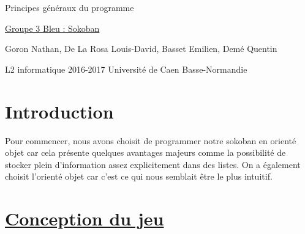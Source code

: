 \documentclass{article}
\begin{document}
\begin{titlepage}
\begin{center}
\Huge Principes généraux du programme

\normalsize
\vspace{0.5cm}
\Large {\underline{ Groupe 3 Bleu : Sokoban} }

\vspace{1cm}
\normalsize
Goron Nathan, De La Rosa Louis-David, Basset Emilien, Demé Quentin

\vspace{14.5cm}
L2 informatique 2016-2017 Université de Caen Basse-Normandie
\end{center}
\end{titlepage}


\newpage
\section{Introduction}
Pour commencer, nous avons choisit de programmer notre sokoban en orienté objet car cela présente quelques avantages majeurs comme la
possibilité de stocker plein d'information assez explicitement dans des listes. On a également choisit l'orienté objet car c'est ce qui 
nous semblait être le plus intuitif.

\section{\underline{Conception du jeu}}
\end{document}
